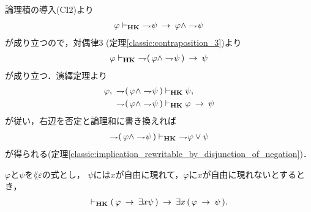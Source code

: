 	\begin{sketch}
		論理積の導入(CI2)より
		\begin{align}
			\varphi \vdash_{{\scriptsize \mbox{{\bf HK}}}}\ \rightharpoondown\hspace{-0.25em} \psi
			\hspace{0.25em}\rightarrow\hspace{0.25em} \varphi \wedge \rightharpoondown\hspace{-0.25em} \psi
		\end{align}
		が成り立つので，対偶律3 (定理\ref{classic:contraposition_3})より
		\begin{align}
			\varphi \provable{\mbox{{\bf HK}}}\ 
			\negation (\, \varphi \wedge \negation \psi\, ) \rarrow \psi
		\end{align}
		が成り立つ．演繹定理より
		\begin{align}
			\varphi,\ \rightharpoondown\hspace{-0.25em} (\, \varphi \wedge \rightharpoondown\hspace{-0.25em} \psi\, ) 
			&\vdash_{{\scriptsize \mbox{{\bf HK}}}} \psi, \\
			\rightharpoondown\hspace{-0.25em} (\, \varphi \wedge \rightharpoondown\hspace{-0.25em} \psi\, ) 
			&\vdash_{{\scriptsize \mbox{{\bf HK}}}} \varphi \hspace{0.25em}\rightarrow\hspace{0.25em} \psi
		\end{align}
		が従い，右辺を否定と論理和に書き換えれば
		\begin{align}
			\rightharpoondown\hspace{-0.25em} (\, \varphi \wedge \rightharpoondown\hspace{-0.25em} \psi\, ) 
			\vdash_{{\scriptsize \mbox{{\bf HK}}}}\ \rightharpoondown\hspace{-0.25em} \varphi \vee \psi
		\end{align}
		が得られる(定理\ref{classic:implication_rewritable_by_disjunction_of_negation})．
		\QED
	\end{sketch}
	
	\begin{screen}
		\begin{thm}
		\label{classic:no_description_2}
			$\varphi$と$\psi$を$\lang{\varepsilon}$の式とし，
			$\psi$には$x$が自由に現れて，$\varphi$に$x$が自由に現れないとするとき，
			\begin{align}
				\vdash_{{\scriptsize \mbox{{\bf HK}}}} (\, \varphi \hspace{0.25em}\rightarrow\hspace{0.25em} \exists x \psi\, )
				\hspace{0.25em}\rightarrow\hspace{0.25em} \exists x\, (\, \varphi \hspace{0.25em}\rightarrow\hspace{0.25em} \psi\, ).
			\end{align}
		\end{thm}
	\end{screen}
	
